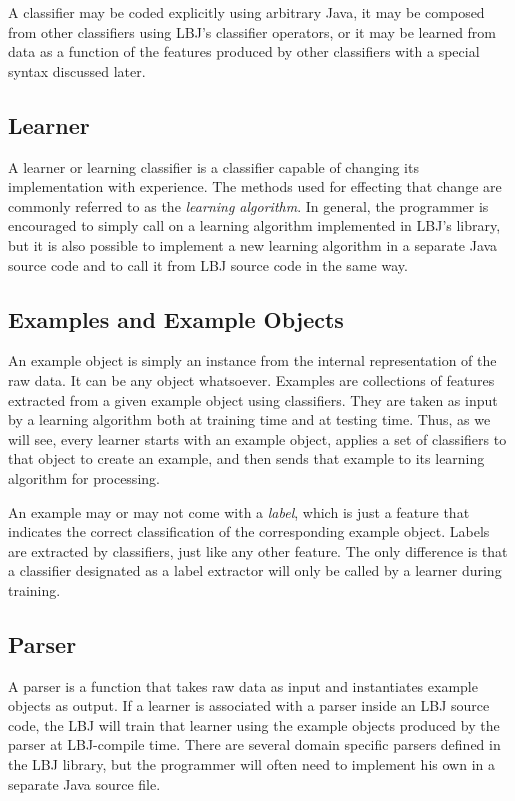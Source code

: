 A classifier may be coded explicitly using arbitrary Java, it may be composed
from other classifiers using LBJ's classifier operators, or it may be learned
from data as a function of the features produced by other classifiers with a
special syntax discussed later.

\subsection*{Learner}
A learner or learning classifier is a classifier capable of changing its
implementation with experience.  The methods used for effecting that change
are commonly referred to as the \emph{learning algorithm}.  In general, the
programmer is encouraged to simply call on a learning algorithm implemented in
LBJ's library, but it is also possible to implement a new learning algorithm
in a separate Java source code and to call it from LBJ source code in the same
way.

\subsection*{Examples and Example Objects}
An example object is simply an instance from the internal representation of
the raw data.  It can be any object whatsoever.  Examples are collections of
features extracted from a given example object using classifiers.  They are
taken as input by a learning algorithm both at training time and at testing
time.  Thus, as we will see, every learner starts with an example object,
applies a set of classifiers to that object to create an example, and then
sends that example to its learning algorithm for processing.

An example may or may not come with a \emph{label}, which is just a feature
that indicates the correct classification of the corresponding example object.
Labels are extracted by classifiers, just like any other feature.  The only
difference is that a classifier designated as a label extractor will only be
called by a learner during training.

\subsection*{Parser}
A parser is a function that takes raw data as input and instantiates example
objects as output.  If a learner is associated with a parser inside an LBJ
source code, the LBJ will train that learner using the example objects
produced by the parser at LBJ-compile time.  There are several domain specific
parsers defined in the LBJ library, but the programmer will often need to
implement his own in a separate Java source file.

